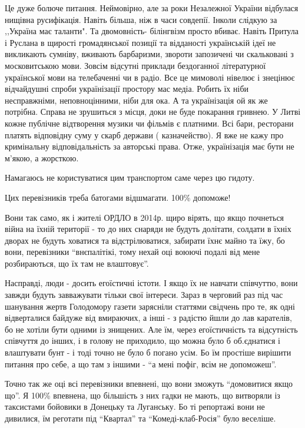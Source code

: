 \begin{itemize}

Це дуже болюче питання. Неймовірно, але за роки Незалежної України відбулася
нищівна русифікація. Навіть більша, ніж в часи совдепії. Інколи слідкую за
,,Україна має таланти". Та двомовність- білінгвізм просто вбиває. Навіть
Притула і Руслана в щирості громадянської позиції та відданості українській
ідеї не викликають сумніву, вживають барбаризми, звороти запозичені чи
скальковані з московитською мови. Зовсім відсутні приклади бездоганної
літературної української мови на телебаченні чи в радіо. Все це мимоволі
нівелює і знецінює відчайдушні спроби українізації простору мас медіа. Робить
їх ніби несправжніми, неповноцінними, ніби для ока. А та українізація ой як же
потрібна. Справа не зрушиться з місця, доки не буде покарання гривнею. У Литві
кожне публічне відтворення музики чи фільмів є платними. Всі бари, ресторани
платять відповідну суму у скарб держави ( казначейство). Я вже не кажу про
кримінальну відповідальність за авторські права. Отже, українізація має бути не
м'якою, а жорсткою.

Намагаюсь не користуватися цим транспортом саме через цю гидоту.

Цих перевізників треба батогами відшмагати. 100\% допоможе!


Вони так само, як і жителі ОРДЛО в 2014р. щиро вірять, що якщо почнеться війна
на їхній території - то до них снаряди не будуть долітати, солдати в їхніх
дворах не будуть ховатися та відстрілюватися, забирати їхнє майно та їжу, бо
вони, перевізники \enquote{внєпалітікі, тому нехай оці воюючі подалі від мене
розбираються, що їх там не влаштовує}.

Насправді, люди - досить егоїстичні істоти. І якщо їх не навчати співчуттю,
вони завжди будуть завважувати тільки свої інтереси. Зараз в черговий раз під
час шанування жертв Голодомору газети зарясніли статтями свідчень про те, як
одні відверталися байдуже від вмираючих, а інші - з радістю йшли до лав
карателів, бо не хотіли бути одними із знищених. Але їм, через егоїстичність та
відсутність співчуття до інших, і в голову не приходило, що можна було б
об.єднатися і влаштувати бунт - і тоді точно не було б погано усім. Бо їм
простіше вирішити питання про себе, а що там з іншими - \enquote{а мені пофіг, всім не
допоможеш}.

Точно так же оці всі перевізники впевнені, що вони зможуть \enquote{домовитися якщо
що}. Я 100\% впевнена, що більшість з них гадки не мають, що витворяли із
таксистами бойовики в Донецьку та Луганську. Бо ті репортажі вони не дивилися,
їм реготати під \enquote{Квартал} та \enquote{Комеді-клаб-Росія} було веселіше.


\end{itemize}
